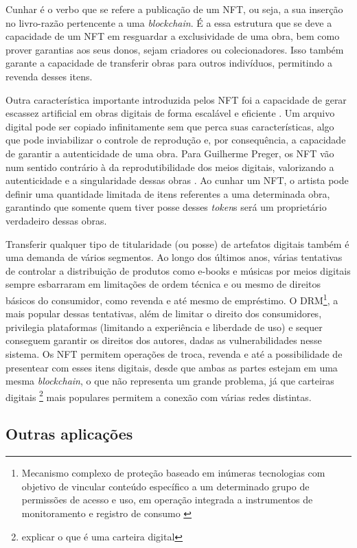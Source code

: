 Cunhar é o verbo que se refere a publicação de um NFT, ou seja, a sua inserção no livro-razão pertencente a uma \textit{blockchain}. É a essa estrutura que se deve a capacidade de um NFT em resguardar a exclusividade de uma obra, bem como prover garantias aos seus donos, sejam criadores ou colecionadores. Isso também garante a capacidade de transferir obras para outros indivíduos, permitindo a revenda desses itens.

Outra característica importante introduzida pelos NFT foi a capacidade de gerar escassez artificial em obras digitais de forma escalável e eficiente \cite{Kugler}. Um arquivo digital pode ser copiado infinitamente sem que perca suas características, algo que pode inviabilizar o controle de reprodução e, por consequência, a capacidade de garantir a autenticidade de uma obra. Para Guilherme Preger, os NFT vão num sentido contrário à da reprodutibilidade dos meios digitais, valorizando a autenticidade e a singularidade dessas obras \cite{Preger}. Ao cunhar um NFT, o artista pode definir uma quantidade limitada de itens referentes a uma determinada obra, garantindo que somente quem tiver posse desses \textit{token}s será um proprietário verdadeiro dessas obras. 

Transferir qualquer tipo de titularidade (ou posse) de artefatos digitais também é uma demanda de vários segmentos. Ao longo dos últimos anos, várias tentativas de controlar a distribuição de produtos como e-books e músicas por meios digitais sempre esbarraram em limitações de ordem técnica e ou mesmo de direitos básicos do consumidor, como revenda e até mesmo de empréstimo. O DRM\footnote{Mecanismo complexo de proteção baseado em inúmeras tecnologias com objetivo de vincular conteúdo específico a um determinado grupo de permissões de acesso e uso, em operação integrada a instrumentos de monitoramento e registro de consumo \cite{Vieira}}, a mais popular dessas tentativas, além de limitar o direito dos consumidores, privilegia plataformas (limitando a experiência e liberdade de uso) e sequer conseguem garantir os direitos dos autores, dadas as vulnerabilidades nesse sistema. Os NFT permitem operações de troca, revenda e até a possibilidade de presentear com esses itens digitais, desde que ambas as partes estejam em uma mesma \textit{blockchain}, o que não representa um grande problema, já que carteiras digitais \footnote{explicar o que é uma carteira digital} mais populares permitem a conexão com várias redes distintas. 

\subsection{Outras aplicações}
\label{subsec: outras aplicações}

